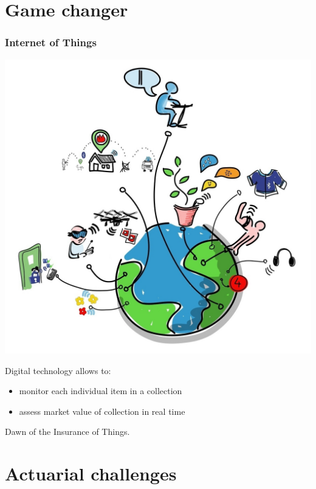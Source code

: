 \section{Game changer}

\begin{frame}
  \frametitle{Internet of Things}

  \begin{minipage}{0.48\linewidth}
    \includegraphics[width=\linewidth]{Internet_of_Things}
  \end{minipage}
  \hfill
  \begin{minipage}{0.48\linewidth}
    Digital technology allows to:
    \begin{itemize}
    \item monitor each individual item in a collection
    \item assess market value of collection in real time
    \end{itemize}
    Dawn of the \alert{Insurance of Things}.
  \end{minipage}
\end{frame}

\section{Actuarial challenges}


